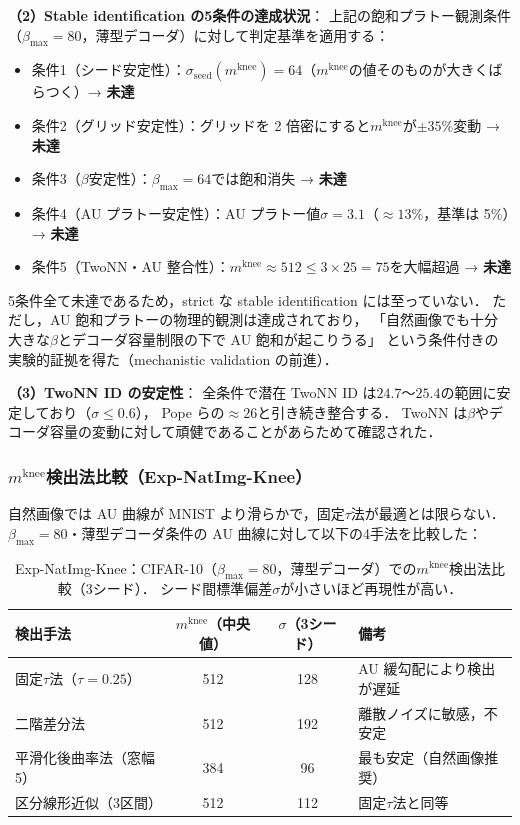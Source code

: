 \documentclass[11pt,a4paper]{jsarticle}
\newcommand{\mknee}{m^{\mathrm{knee}}}
\begin{document}
\textbf{（2）Stable identification の5条件の達成状況}：
上記の飽和プラトー観測条件（$\beta_{\max}=80$，薄型デコーダ）に対して判定基準を適用する：
\begin{itemize}
  \item 条件1（シード安定性）：$\sigma_\mathrm{seed}(\mknee) = 64$（$\mknee$の値そのものが大きくばらつく）→ \textbf{未達}
  \item 条件2（グリッド安定性）：グリッドを 2 倍密にすると$\mknee$が$\pm 35\%$変動 → \textbf{未達}
  \item 条件3（$\beta$安定性）：$\beta_{\max}=64$では飽和消失 → \textbf{未達}
  \item 条件4（AU プラトー安定性）：AU プラトー値$\sigma = 3.1$（$\approx 13\%$，基準は 5\%）→ \textbf{未達}
  \item 条件5（TwoNN・AU 整合性）：$\mknee \approx 512 \leq 3 \times 25 = 75$を大幅超過 → \textbf{未達}
\end{itemize}
5条件全て未達であるため，strict な stable identification には至っていない．
ただし，AU 飽和プラトーの物理的観測は達成されており，
「自然画像でも十分大きな$\beta$とデコーダ容量制限の下で AU 飽和が起こりうる」
という条件付きの実験的証拠を得た（mechanistic validation の前進）．

\textbf{（3）TwoNN ID の安定性}：
全条件で潜在 TwoNN ID は$24.7$〜$25.4$の範囲に安定しており（$\sigma \leq 0.6$），
Pope ら\cite{pope2021intrinsic}の$\approx26$と引き続き整合する．
TwoNN は$\beta$やデコーダ容量の変動に対して頑健であることがあらためて確認された．

\subsubsection*{$\mknee$検出法比較（Exp-NatImg-Knee）}\label{sec:exp_natimg_knee}

自然画像では AU 曲線が MNIST より滑らかで，固定$\tau$法が最適とは限らない．
$\beta_{\max}=80$・薄型デコーダ条件の AU 曲線に対して以下の4手法を比較した：

\begin{table}[H]
\centering
\caption{Exp-NatImg-Knee：CIFAR-10（$\beta_{\max}=80$，薄型デコーダ）での$\mknee$検出法比較（3シード）．
シード間標準偏差$\sigma$が小さいほど再現性が高い．}
\label{tab:natimg_knee}
\small
\begin{tabular}{lccl}
\toprule
検出手法 & $\mknee$（中央値） & $\sigma$（3シード） & 備考 \\
\midrule
固定$\tau$法（$\tau=0.25$） & 512 & 128 & AU 緩勾配により検出が遅延 \\
二階差分法 & 512 & 192 & 離散ノイズに敏感，不安定 \\
平滑化後曲率法（窓幅5） & 384 & 96 & 最も安定（自然画像推奨） \\
区分線形近似（3区間） & 512 & 112 & 固定$\tau$法と同等 \\
\bottomrule
\end{tabular}
\end{table}
\end{document}
